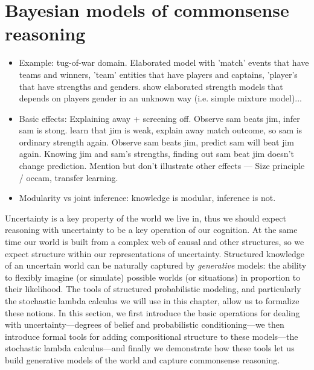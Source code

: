 \documentclass[12pt]{article}
\begin{document}
\section{Bayesian models of commonsense reasoning}
\begin{itemize}

  
  
  
\item Example: tug-of-war domain. Elaborated model with 'match' events that have teams and winners, 'team' entities that have players and captains, 'player's that have strengths and genders. show elaborated strength models that depends on players gender in an unknown way (i.e. simple mixture model)...  
  
\item Basic effects: Explaining away + screening off. 
\subitem  Observe sam beats jim, infer sam is stong. learn that jim is weak, explain away match outcome, so sam is ordinary strength again.
\subitem  Observe sam beats jim, predict sam will beat jim again. Knowing jim and sam's strengths, finding out sam beat jim doesn't change prediction. 
\subitem   Mention but don't illustrate other effects ---  Size principle / occam, transfer learning.
  
\item  Modularity vs joint inference: knowledge is modular, inference is not.
  
\end{itemize}
 

Uncertainty is a key property of the world we live in, thus we should expect reasoning with uncertainty to be a key operation of our cognition. At the same time our world is built from a complex web of causal and other structures, so we expect structure within our representations of uncertainty. Structured knowledge of an uncertain world can be naturally captured by \emph{generative} models: the ability to flexibly imagine (or simulate) possible worlds (or situations) in proportion to their likelihood. The tools of structured probabilistic modeling, and particularly the stochastic lambda calculus we will use in this chapter, allow us to formalize these notions. In this section, we first introduce the basic operations for dealing with uncertainty---degrees of belief and probabilistic conditioning---we then introduce formal tools for adding compositional structure to these models---the stochastic lambda calculus---and finally we demonstrate how these tools let us build generative models of the world and capture commonsense reasoning.
\end{document}

